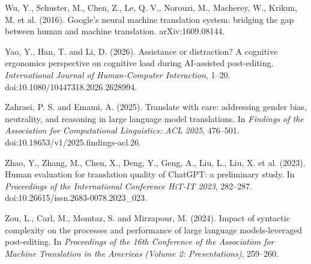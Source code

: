\documentclass[11pt]{article}
\begin{document}
Wu, Y., Schuster, M., Chen, Z., Le, Q. V., Norouzi, M., Macherey, W., Krikun, M. et al. (2016). Google's neural machine translation system: bridging the gap between human and machine translation. arXiv:1609.08144.

Yao, Y., Han, T. and Li, D. (2026). Assistance or distraction? A cognitive ergonomics perspective on cognitive load during AI-assisted post-editing. \emph{International Journal of Human-Computer Interaction}, 1--20. doi:10.1080/10447318.2026.2628994.

Zahraei, P. S. and Emami, A. (2025). Translate with care: addressing gender bias, neutrality, and reasoning in large language model translations. In \emph{Findings of the Association for Computational Linguistics: ACL 2025}, 476--501. doi:10.18653/v1/2025.findings-acl.26.

Zhao, Y., Zhang, M., Chen, X., Deng, Y., Geng, A., Liu, L., Liu, X. et al. (2023). Human evaluation for translation quality of ChatGPT: a preliminary study. In \emph{Proceedings of the International Conference HiT-IT 2023}, 282--287. doi:10.26615/issn.2683-0078.2023\_023.

Zou, L., Carl, M., Momtaz, S. and Mirzapour, M. (2024). Impact of syntactic complexity on the processes and performance of large language models-leveraged post-editing. In \emph{Proceedings of the 16th Conference of the Association for Machine Translation in the Americas (Volume 2: Presentations)}, 259--260.
\end{document}
